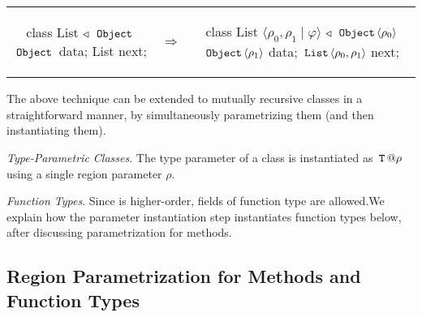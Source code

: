 \begin{tabular}{ccc}
\begin{minipage}{0.28\linewidth}
\begin{codejava}
class List
  $\triangleleft$ $\,{\tt Object}\,$
{
  $\,{\tt Object}\,$ data;
  List next;
}
\end{codejava}
\end{minipage}
&
$\Rightarrow$
&
\begin{minipage}{0.5\linewidth}
\begin{codejava}
class List $\langle \rho_0, \rho_1 \; | \; \varphi \rangle$
  $\triangleleft$ $\,{\tt Object}\, \langle \rho_0 \rangle$
{
  $\,{\tt Object}\, \langle \rho_1 \rangle$ data;
  $\,{\tt List}\, \langle \rho_0, \rho_1 \rangle$ next;
}
\end{codejava}
\end{minipage}
\end{tabular}

The above technique can be extended to mutually recursive classes in a
straightforward manner, by simultaneously parametrizing them (and
then instantiating them).

\emph{Type-Parametric Classes}.
The type parameter  of a class  is instantiated as $\,{\tt T}\,@\rho$ using a single region parameter $\rho$. 

\emph{Function Types}.
Since \FB{} is higher-order, fields of function type are allowed.We explain how the parameter instantiation step
instantiates function types below, after discussing parametrization for methods.




\subsection{Region Parametrization for Methods and Function Types}


